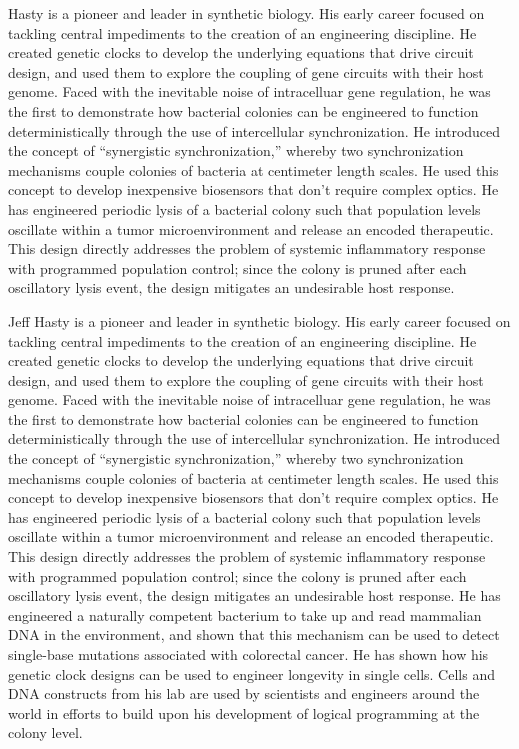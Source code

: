 Hasty is a pioneer and leader in synthetic biology. His early career focused on tackling central impediments to the creation of an engineering discipline. He created genetic clocks to develop the underlying equations that drive circuit design, and used them to explore the coupling of gene circuits with their host genome. Faced with the inevitable noise of intracelluar gene regulation, he was the first to demonstrate how bacterial colonies can be engineered to function deterministically through the use of intercellular synchronization. He introduced the concept of “synergistic synchronization,” whereby two synchronization mechanisms couple colonies of bacteria at centimeter length scales. He used this concept to develop inexpensive biosensors that don't require complex optics. He has engineered periodic lysis of a bacterial colony such that population levels oscillate within a tumor microenvironment and release an encoded therapeutic. This design directly addresses the problem of systemic inflammatory response with programmed population control; since the colony is pruned after each oscillatory lysis event, the design mitigates an undesirable host response.      

Jeff Hasty is a pioneer and leader in synthetic biology. His early career focused on tackling central impediments to the creation of an engineering discipline. He created genetic clocks to develop the underlying equations that drive circuit design, and used them to explore the coupling of gene circuits with their host genome. Faced with the inevitable noise of intracelluar gene regulation, he was the first to demonstrate how bacterial colonies can be engineered to function deterministically through the use of intercellular synchronization. He introduced the concept of “synergistic synchronization,” whereby two synchronization mechanisms couple colonies of bacteria at centimeter length scales. He used this concept to develop inexpensive biosensors that don't require complex optics. He has engineered periodic lysis of a bacterial colony such that population levels oscillate within a tumor microenvironment and release an encoded therapeutic. This design directly addresses the problem of systemic inflammatory response with programmed population control; since the colony is pruned after each oscillatory lysis event, the design mitigates an undesirable host response. He has engineered a naturally competent bacterium to take up and read mammalian DNA in the environment, and shown that this mechanism can be used to detect single-base mutations associated with colorectal cancer.  He has shown how his genetic clock designs can be used to engineer longevity in single cells. Cells and DNA constructs from his lab are used by scientists and engineers around the world in efforts to build upon his development of logical programming at the colony level. 

